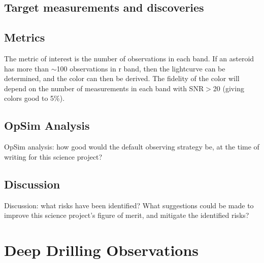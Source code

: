 \subsection{Target measurements and discoveries}
\label{sec:\secname:targets}




\subsection{Metrics}
\label{sec:\secname:metrics}

The metric of interest is the number
of observations in each band. If an asteroid has
more than $\sim$100 observations in r band,
then the lightcurve can be determined, and the
color can then be derived. The fidelity of the color
will depend on the number of measurements in
each band with SNR$>$20 (giving colors good to
5\%).




\subsection{OpSim Analysis}
\label{sec:\secname:analysis}

OpSim analysis: how good would the default observing strategy be, at
the time of writing for this science project?



\subsection{Discussion}
\label{sec:\secname:discussion}

Discussion: what risks have been identified? What suggestions could be
made to improve this science project's figure of merit, and mitigate
the identified risks?

\navigationbar

%
%

\section{Deep Drilling Observations}
\def\secname{\chpname:dd}\label{sec:\secname}

